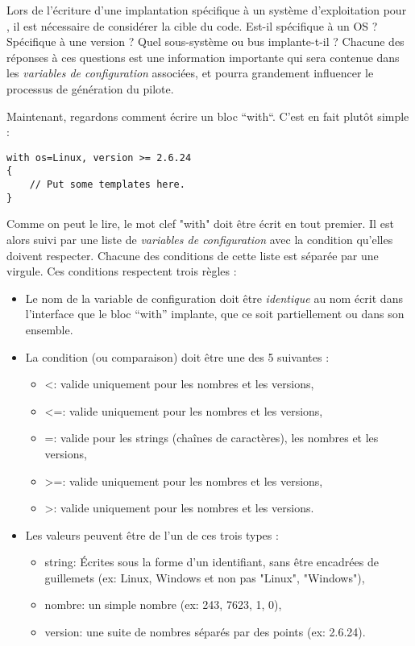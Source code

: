 \documentclass[french]{rtxreport}
\begin{document}
Lors de l'écriture d'une implantation spécifique à un système d'exploitation
pour \rtx, il est nécessaire de considérer la cible du code. Est-il spécifique
à un OS ? Spécifique à une version ? Quel sous-système ou bus implante-t-il ?
Chacune des réponses à ces questions est une information importante qui sera
contenue dans les \emph{variables de configuration} associées, et pourra
grandement influencer le processus de génération du pilote.

Maintenant, regardons comment écrire un bloc “with“. C'est en fait plutôt
simple :
\begin{lstlisting}
with os=Linux, version >= 2.6.24
{
    // Put some templates here.
}
\end{lstlisting}

Comme on peut le lire, le mot clef "with" doit être écrit en tout premier. Il
est alors suivi par une liste de \emph{variables de configuration} avec la
condition qu'elles doivent respecter. Chacune des conditions de cette liste est
séparée par une virgule. Ces conditions respectent trois règles :
\begin{itemize}
    \item Le nom de la variable de configuration doit être \emph{identique}
          au nom écrit dans l'interface que le bloc “with” implante, que ce
          soit partiellement ou dans son ensemble.
    \item La condition (ou comparaison) doit être une des 5 suivantes : 
        \begin{itemize}
            \item <: valide uniquement pour les nombres et les versions,
            \item <=: valide uniquement pour les nombres et les versions,
            \item =: valide pour les strings (chaînes de caractères),
                     les nombres et les versions,
            \item >=: valide uniquement pour les nombres et les versions,
            \item >: valide uniquement pour les nombres et les versions.
        \end{itemize}
    \item Les valeurs peuvent être de l'un de ces trois types :
        \begin{itemize}
            \item string: Écrites sous la forme d'un identifiant, sans être
                          encadrées de guillemets
                           (ex: Linux, Windows et non pas "Linux", "Windows"),
            \item nombre: un simple nombre (ex: 243, 7623, 1, 0),
            \item version: une suite de nombres séparés par des points
                           (ex: 2.6.24).
        \end{itemize}
\end{itemize}
\end{document}
